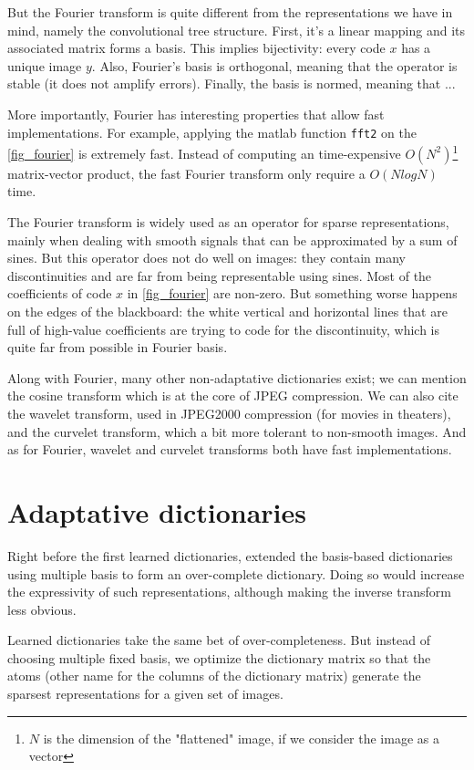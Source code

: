 But the Fourier transform is quite different from the representations we have in mind, namely the convolutional tree structure. First, it's a linear mapping and its associated matrix forms a basis. This implies bijectivity: every code $x$ has a unique image $y$. Also, Fourier's basis is orthogonal, meaning that the operator is stable (it does not amplify errors). Finally, the basis is normed, meaning that ... %

More importantly, Fourier has interesting properties that allow fast implementations. For example, applying the matlab function \texttt{fft2} on the \cref{fig_fourier} is extremely fast. Instead of computing an time-expensive $O(N^2)$\footnote{$N$ is the dimension of the "flattened" image, if we consider the image as a vector} matrix-vector product, the fast Fourier transform only require a $O(NlogN)$ time.

The Fourier transform is widely used as an operator for sparse representations, mainly when dealing with smooth signals that can be approximated by a sum of sines. But this operator does not do well on images: they contain many discontinuities and are far from being representable using sines. Most of the coefficients of code $x$ in \cref{fig_fourier} are non-zero. But something worse happens on the edges of the blackboard: the white vertical and horizontal lines that are full of high-value coefficients are trying to code for the discontinuity, which is quite far from possible in Fourier basis.

Along with Fourier, many other non-adaptative dictionaries exist; we can mention the cosine transform which is at the core of JPEG compression. We can also cite the wavelet transform, used in JPEG2000 compression (for movies in theaters), and the curvelet transform, which a bit more tolerant to non-smooth images. And as for Fourier, wavelet and curvelet transforms both have fast implementations.


\section{Adaptative dictionaries}
Right before the first learned dictionaries, \cite{chen_atomic_2001} extended the basis-based dictionaries using multiple basis to form an over-complete dictionary. Doing so would increase the expressivity of such representations, although making the inverse transform less obvious. %

Learned dictionaries take the same bet of over-completeness. But instead of choosing multiple fixed basis, we optimize the dictionary matrix so that the atoms (other name for the columns of the dictionary matrix) generate the sparsest representations for a given set of images.

